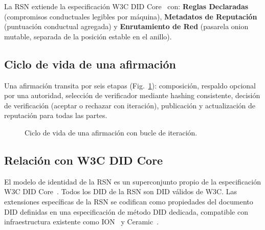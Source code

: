 \documentclass[11pt,a4paper,twocolumn]{article}
\begin{document}
La RSN extiende la especificación W3C DID Core~\cite{did2022} con: \textbf{Reglas Declaradas} (compromisos conductuales legibles por máquina), \textbf{Metadatos de Reputación} (puntuación conductual agregada) y \textbf{Enrutamiento de Red} (pasarela onion mutable, separada de la posición estable en el anillo).

\subsection{Ciclo de vida de una afirmación}

Una afirmación transita por seis etapas (Fig.~\ref{fig:lifecycle}): composición, respaldo opcional por una autoridad, selección de verificador mediante hashing consistente, decisión de verificación (aceptar o rechazar con iteración), publicación y actualización de reputación para todas las partes.

\begin{figure}[ht]
\centering
{}
\caption{Ciclo de vida de una afirmación con bucle de iteración.}
\label{fig:lifecycle}
\end{figure}

\subsection{Relación con W3C DID Core}

El modelo de identidad de la RSN es un superconjunto propio de la especificación W3C DID Core~\cite{did2022}. Todos los DID de la RSN son DID válidos de W3C. Las extensiones específicas de la RSN se codifican como propiedades del documento DID definidas en una especificación de método DID dedicada, compatible con infraestructura existente como ION~\cite{buchner2021} y Ceramic~\cite{ceramic2023}.
\end{document}
